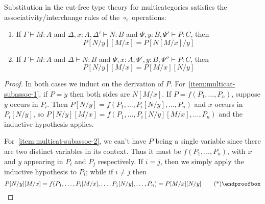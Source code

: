 \documentclass{book}
\let\types\vdash
\begin{document}
\begin{thm}\label{thm:multicat-subassoc}
  Substitution in the cut-free type theory for multicategories satisfies the associativity/interchange rules of the $\circ_i$ operations:
  \begin{enumerate}
  \item If $\Gamma\types M:A$ and $\Delta,x:A,\Delta' \types N:B$ and $\Psi,y:B,\Psi'\types P:C$, then\label{item:multicat-subassoc-1}
    \[ P[N/y][M/x] = P[N[M/x]/y] \]
  \item If $\Gamma\types M:A$ and $\Delta \types N:B$ and $\Psi,x:A,\Psi',y:B,\Psi''\types P:C$, then\label{item:multicat-subassoc-2}
    \[ P[N/y][M/x] = P[M/x][N/y] \]
  \end{enumerate}
\end{thm}
\begin{proof}
  In both cases we induct on the derivation of $P$.
  For~\ref{item:multicat-subassoc-1}, if $P=y$ then both sides are $N[M/x]$.
  If $P=f(P_1,\dots,P_n)$, suppose $y$ occurs in $P_i$.
  Then $P[N/y] = f(P_1,\dots,P_i[N/y],\dots,P_n)$ and $x$ occurs in $P_i[N/y]$, so
  $P[N/y][M/x] = f(P_1,\dots,P_i[N/y][M/x],\dots,P_n)$ and the inductive hypothesis applies.

  For~\ref{item:multicat-subassoc-2}, we can't have $P$ being a single variable since there are two distinct variables in its context.
  Thus it must be $f(P_1,\dots,P_n)$, with $x$ and $y$ appearing in $P_i$ and $P_j$ respectively.
  If $i=j$, then we simply apply the inductive hypothesis to $P_i$; while if $i\neq j$ then
  \begin{equation*}
    P[N/y][M/x] = f(P_1,\dots,P_i[M/x],\dots,P_j[N/y],\dots,P_n) = P[M/x][N/y]\qedhere
  \end{equation*}
\end{proof}
\end{document}
